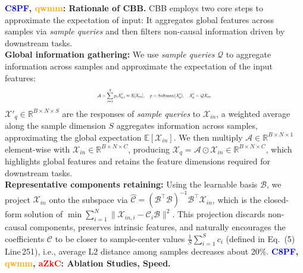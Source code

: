 \documentclass[10pt,twocolumn,letterpaper]{article}
\begin{document}
\noindent\textbf{\textcolor{blue}{C8PF}, \textcolor{orange}{qwmm}: Rationale of CBB.}
CBB employs two core steps to approximate the expectation of input: 
It aggregates global features across samples via \textit{sample queries} and then filters non-causal information driven by downstream tasks.
\\
\textbf{Global information gathering:} We use \textit{sample queries} \(\mathcal{Q}\) to aggregate information across samples and approximate the expectation of the input features:
\vspace{-6pt}
\begin{equation*}
\resizebox{0.4\textwidth}{!}{%
$\displaystyle
\mathcal{A} = \sum_{i=1}^{S} p_i \mathcal{X}'_{q,i} \approx \mathbb{E}[\mathcal{X}_{in}], \quad 
p = \operatorname{Softmax}(\mathcal{X}'_q), \quad \mathcal{X}'_{q} = \mathcal{Q}\mathcal{X}_{in}
$.}
\vspace{-2mm}
\end{equation*}
\(\mathcal{X}'_q\!\in\!\mathbb{R}^{B \times N \times S}\) are the responses of \textit{sample queries} to \(\mathcal{X}_{in}\), a weighted average along the sample dimension \(S\) aggregates information across samples, 
approximating the global expectation \(\mathbb{E}[\mathcal{X}_{in}]\).
We then multiply \(\mathcal{A} \!\in\! \mathbb{R}^{B \times N \times 1}\)
element-wise with \(\mathcal{X}_{in} \!\in\! \mathbb{R}^{B \times N \times C}\), 
producing \(\mathcal{X}_{q} \!= \!\mathcal{A} \!\odot \!\mathcal{X}_{in} \!\in \!\mathbb{R}^{B \times N \times C}\), which highlights global features and retains the feature dimensions required for downstream tasks.
\\
\textbf{Representative components retaining:} Using the learnable basis \(\mathcal{B}\), we project \(\mathcal{X}_{in}\) onto the subspace via \(\hat{\mathcal{C}} = (\mathcal{B}^\top \mathcal{B})^{-1} \mathcal{B}^\top \mathcal{X}_{in}\), which is the closed-form solution of
\(\min \sum_{i=1}^{N} \|\mathcal{X}_{{in},i} - \mathcal{C}_i \mathcal{B}\|^2\). 
This projection discards non-causal components, preserves intrinsic features, and naturally encourages the coefficients \(\mathcal{C}\) to be closer to sample-center values \(\frac{1}{S}\sum_{i=1}^S c_{i}\) (defined in Eq.~(5) Line\,251), i.e., average L2 distance among samples decreases about 20\%.
\noindent\textbf{\textcolor{blue}{C8PF}, \textcolor{orange}{qwmm}, \textcolor{red}{aZkC}: Ablation Studies, Speed.}
\end{document}

